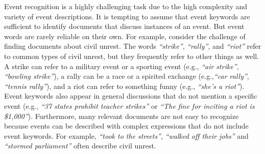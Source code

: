 Event recognition is a highly challenging task due to the high
complexity and variety of event descriptions.
It is tempting to assume that event keywords
are sufficient to identify documents that discuss instances
of an event. But event words are rarely reliable
on their own. 
For example, consider the challenge
of finding documents about civil unrest. The words {\it ``strike''},
{\it ``rally''}, and {\it ``riot''} refer to common types of civil unrest, but
they frequently refer to other things as well.  A  strike can refer
to a military event or a sporting event (e.g., {\it ``air
strike''}, {\it ``bowling strike''}), a rally can be a race or a
spirited exchange (e.g.,{\it ``car rally''}, {\it ``tennis rally''}), and a riot
can refer to something funny (e.g., {\it ``she's a riot''}).
Event keywords also appear in general discussions that do not
mention a specific event (e.g., {\it ``37 states
prohibit teacher strikes''} or {\it ``The fine for inciting a riot is \$1,000''}).  
Furthermore, many relevant documents are not easy to recognize
because events can be described with complex expressions that do not include 
event keywords. %
For example, 
{\it ``took to the streets''}, {\it ``walked off their jobs''} and {\it ``stormed
 parliament''} often describe civil unrest. 

